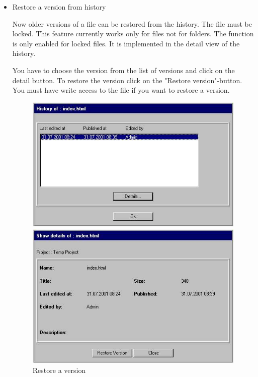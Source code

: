 \begin{itemize}
\item Restore a version from history  

Now older versions of a file can be restored from the history. The
file must be locked. This feature currently works only for files
not for folders. The function is only enabled for locked files. It
is implemented in the detail view of the history.

You have to choose the version from the list of versions and click
on the detail button. To restore the version click on the "Restore
version"-button. You must have write access to the file if you
want to restore a version.

\begin{figure}[hbt]
\begin{minipage}[b]{0.49\linewidth}
\begin{center}
\includegraphics[width=\sgw]
                   {pics/newProject/restore01}
\end{center}
\end{minipage}
\begin{minipage}[b]{0.49\linewidth}
\begin{center}
\includegraphics[width=\sgw]
                   {pics/newProject/restore02}
\end{center}
\end{minipage}
\caption[Restore a version]
           {Restore a version}
\label{restorever}
\end{figure}



\end{itemize}
